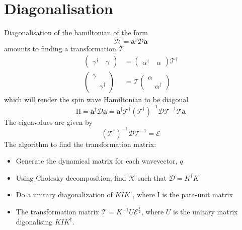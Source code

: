 \section{Diagonalisation}
Diagonalisation of the hamiltonian of the form 
\begin{equation}
    \mathcal{H} = \textbf{a}^\dagger\mathcal{D}\textbf{a}
\end{equation}
amounts to finding a transformation $\mathcal{T}$
\begin{equation}
\begin{split}
       \begin{pmatrix}
        \gamma ^\dagger \quad \gamma
    \end{pmatrix}
     &= \begin{pmatrix}
     \alpha ^\dagger \quad \alpha
     \end{pmatrix}
     \mathcal{T}^\dagger \\
     \begin{pmatrix}
        \gamma  \\ \quad \gamma ^\dagger
    \end{pmatrix}
     &= \mathcal{T}\begin{pmatrix}
     \alpha \\ \quad \alpha ^\dagger
     \end{pmatrix}
\end{split}
\end{equation}
which will render the spin wave Hamiltonian to be diagonal
\begin{equation}
    \mathrm{H} = \textbf{a}^\dagger\mathcal{D}\textbf{a} = \textbf{a}^\dagger\mathcal{T}^\dagger(\mathcal{T}^\dagger)^{-1}\mathcal{D}\mathcal{T}^{-1}\mathcal{T}\textbf{a}
\end{equation}
The eigenvalues are given by
\begin{equation}
    (\mathcal{T}^\dagger)^{-1}\mathcal{D}\mathcal{T}^{-1} = \mathcal{E}
\end{equation}
The algorithm to find the transformation matrix:
\begin{itemize}
		\item Generate the dynamical matrix for each wavevector, $ q $
		\item Using Cholesky decomposition, find $ \mathcal{K} $ such that $ \mathcal{D} = K^\dagger K $
		\item Do a unitary diagonalization of $ KIK^\dagger $, where I is the para-unit matrix
		\item The transformation matrix $\mathcal{T} = K^{-1}U\mathcal{E}^{\frac{1}{2}}$, where $U$ is the unitary matrix digonalising $KIK^\dagger$. 
\end{itemize}
\setcounter{equation}{0}
\setcounter{table}{0}
\setcounter{figure}{0}


    



